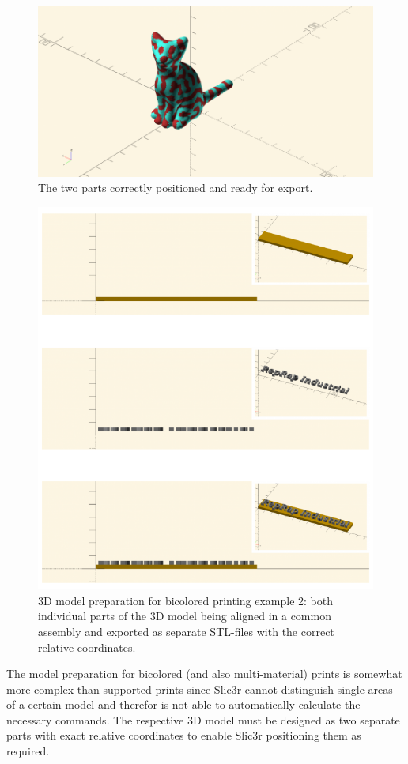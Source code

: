 \begin{figure}[H]
  \centering
  \includegraphics[width=.7\linewidth]{./img/cat_merged.png}
  \caption{The two parts correctly positioned and ready for export.}
\end{figure}

\begin{figure}[H]
  \centering
  \includegraphics[width=.7\linewidth]{./img/slic3r_bicolor_1.png}
  \caption{3D model preparation for bicolored printing example 2: both individual parts 
           of the 3D model being aligned in a common assembly and exported as separate STL-files with the correct relative coordinates.}
\end{figure}

The model preparation for bicolored (and also multi-material) prints is somewhat more complex than supported prints since Slic3r cannot distinguish single areas of a certain model and therefor is not able to automatically calculate the necessary commands. The respective 3D model must be designed as two separate parts with exact relative coordinates to enable Slic3r positioning them as required.

